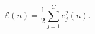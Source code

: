\begin{equation}
\label{eq:insterrorenergy}
\mathscr{E}(n) = \frac{1}{2}
\sum_{j=1}^{C}{\mathit{e}_j^2(n)}.
\end{equation}
